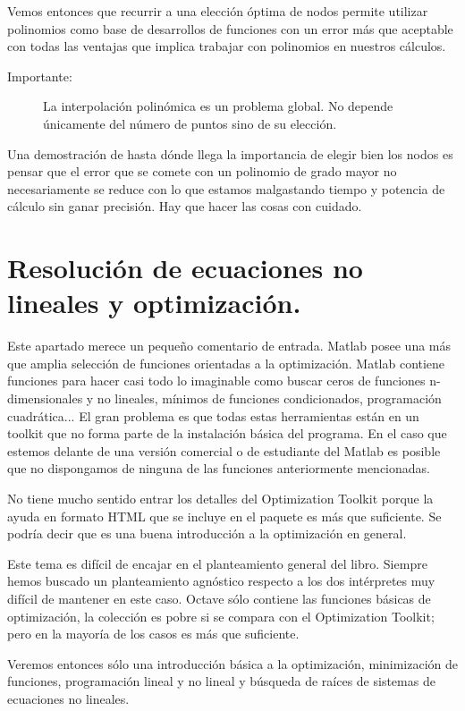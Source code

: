 Vemos entonces que recurrir a una elección óptima de nodos permite
utilizar polinomios como base de desarrollos de funciones con un error
más que aceptable con todas las ventajas que implica trabajar con
polinomios en nuestros cálculos.

\begin{description}
\item [Importante:]La interpolación polinómica es un problema global.
  No depende únicamente del número de puntos sino de su elección.
\end{description}
Una demostración de hasta dónde llega la importancia de elegir bien
los nodos es pensar que el error que se comete con un polinomio de
grado mayor no necesariamente se reduce con lo que estamos malgastando
tiempo y potencia de cálculo sin ganar precisión. Hay que hacer las
cosas con cuidado.


\section{Resolución de ecuaciones no lineales y optimización.}

Este apartado merece un pequeño comentario de entrada. Matlab posee
una más que amplia selección de funciones orientadas a la
optimización.  Matlab contiene funciones para hacer casi todo lo
imaginable como buscar ceros de funciones n-dimensionales y no
lineales, mínimos de funciones condicionados, programación
cuadrática... El gran problema es que todas estas herramientas están
en un toolkit que no forma parte de la instalación básica del
programa. En el caso que estemos delante de una versión comercial o de
estudiante del Matlab es posible que no dispongamos de ninguna de las
funciones anteriormente mencionadas.

No tiene mucho sentido entrar los detalles del Optimization Toolkit
porque la ayuda en formato HTML que se incluye en el paquete es más
que suficiente. Se podría decir que es una buena introducción a la
optimización en general.

Este tema es difícil de encajar en el planteamiento general del libro.
Siempre hemos buscado un planteamiento agnóstico respecto a los dos
intérpretes muy difícil de mantener en este caso. Octave sólo contiene
las funciones básicas de optimización, la colección es pobre si se
compara con el Optimization Toolkit; pero en la mayoría de los casos
es más que suficiente.

Veremos entonces sólo una introducción básica a la optimización,
minimización de funciones, programación lineal y no lineal y búsqueda
de raíces de sistemas de ecuaciones no lineales.


